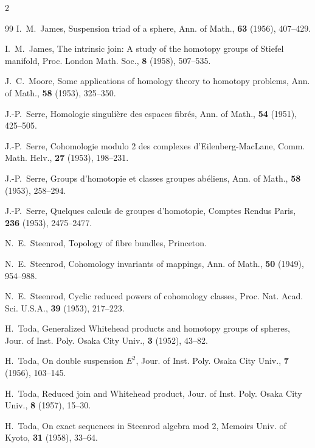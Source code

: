 \documentclass[10pt, leqno]{ltjsarticle}
\numberwithin{equation}{section}
\theoremstyle{plain}
\theoremstyle{definition}
\theoremstyle{remark}
\begin{document}
\begin{paracol}{2}
\begin{thebibliography}{99}
I.~M.~James,
\newblock Suspension triad of a sphere,
\newblock Ann. of Math., {\bf 63} (1956), 407--429.

I.~M.~James,
\newblock The intrinsic join: A study of the homotopy groups of Stiefel manifold,
\newblock Proc. London Math. Soc., {\bf 8} (1958), 507--535.

J.~C.~Moore,
\newblock Some applications of homology theory to homotopy problems,
\newblock Ann. of Math., {\bf 58} (1953), 325--350.

J.-P.~Serre,
\newblock Homologie singulière des espaces fibrés,
\newblock Ann. of Math., {\bf 54} (1951), 425--505.

J.-P.~Serre,
\newblock Cohomologie modulo 2 des complexes d'Eilenberg-MacLane,
\newblock Comm. Math. Helv., {\bf 27} (1953), 198--231.

J.-P.~Serre,
\newblock Groups d'homotopie et classes groupes abéliens,
\newblock Ann. of Math., {\bf 58} (1953), 258--294.

J.-P.~Serre,
\newblock Quelques calculs de groupes d'homotopie,
\newblock Comptes Rendus Paris, {\bf 236} (1953), 2475--2477.

N.~E.~Steenrod,
\newblock Topology of fibre bundles,
\newblock Princeton.

N.~E.~Steenrod,
\newblock Cohomology invariants of mappings,
\newblock Ann. of Math., {\bf 50} (1949), 954--988.

N.~E.~Steenrod,
\newblock Cyclic reduced powers of cohomology classes,
\newblock Proc. Nat. Acad. Sci. U.S.A., {\bf 39} (1953), 217--223.

H.~Toda,
\newblock Generalized Whitehead products and homotopy groups of spheres,
\newblock Jour. of Inst. Poly. Osaka City Univ., {\bf 3} (1952), 43--82.

H.~Toda,
\newblock On double suspension $E^2$,
\newblock Jour. of Inst. Poly. Osaka City Univ., {\bf 7} (1956), 103--145.

H.~Toda,
\newblock Reduced join and Whitehead product,
\newblock Jour. of Inst. Poly. Osaka City Univ., {\bf 8} (1957), 15--30.

H.~Toda,
\newblock On exact sequences in Steenrod algebra mod 2,
\newblock Memoirs Univ. of Kyoto, {\bf 31} (1958), 33--64.


\end{thebibliography}
\end{paracol}
\end{document}
